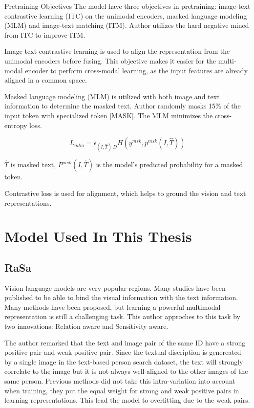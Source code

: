 Pretraining Objectives
The model have three objectives in pretraining: image-text contrastive learning (ITC) on the unimodal encoders, masked language modeling (MLM) and image-text matching (ITM).
Author utilizes the hard negative mined from ITC to improve ITM.

Image text contrastive learning is used to align the representation from the unimodal encoders before fusing. This objective makes it easier for the multi-modal encoder to perform cross-modal learning, as the input features are already aligned in a common space. 

Masked language modeling (MLM) is utilized with both image and text information to determine the masked text. Author randomly masks 15\% of the input token with specialized token [MASK]. The MLM minimizes the cross-entropy loss.

\begin{displaymath}
    L_{mlm} = \epsilon_{(I,\hat{T})~D}H(y^{msk}, p^{msk}(I,\hat{T}))
\end{displaymath}

$\hat{T}$ is masked text, $P^{msk}(I,\hat{T})$ is the model's predicted probability for a masked token. 

Contrastive loss is used for alignment, which helps to ground the vision and text representations.



\section{Model Used In This Thesis}
\subsection{RaSa}

Vision language models are very popular regions. Many studies have been published to be able to bind the visual information with the text information. Many methods have been proposed, but learning a powerful multimodal representation is still a challenging task. This author approches to this task by two innovations: Relation aware and Sensitivity aware.

The author remarked that the text and image pair of the same ID have a strong positive pair and weak positive pair. Since the textual discription is genereated by a single image in the text-based person search dataset, the text will strongly correlate to the image but it is not always well-aligned to the other images of the same person. Previous methods did not take this intra-variation into account when training, they put the equal weight for strong and weak positive pairs in learning representations. This lead the model to overfitting due to the weak pairs.

